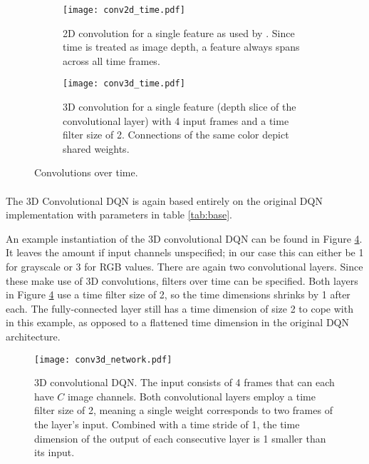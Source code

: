 \begin{figure}[!htpb]
  \begin{subfigure}[t]{.45\textwidth}
    \centering
    \texttt{[image: conv2d\_time.pdf]}
    \caption{
      2D convolution for a single feature as used by \cite{Mnih2013}.
      Since time is treated as image depth,
      a feature always spans across all time frames.
    }
    \label{fig:conv2d_time}
  \end{subfigure}
  \hfill
  \begin{subfigure}[t]{.45\textwidth}
    \centering
    \texttt{[image: conv3d\_time.pdf]}
    \caption{
      3D convolution for a single feature
      (depth slice of the convolutional layer)
      with 4 input frames
      and a time filter size of 2.
      Connections of the same color depict shared weights.
    }
    \label{fig:conv3d_time}
  \end{subfigure}
  \caption{
    Convolutions over time.
  }
  \label{fig:conv3d}
\end{figure}

\paragraph{}
The 3D Convolutional DQN
is again based entirely on the original DQN implementation
with parameters in table \ref{tab:base}.

An example instantiation of the 3D convolutional DQN
can be found in Figure \ref{fig:conv3d_network}.
It leaves the amount if input channels unspecified;
in our case this can either be 1 for grayscale
or 3 for RGB values.
There are again two convolutional layers.
Since these make use of 3D convolutions,
filters over time can be specified.
Both layers in Figure \ref{fig:conv3d_network}
use a time filter size of 2,
so the time dimensions shrinks by 1 after each.
The fully-connected layer
still has a time dimension of size 2 to cope with in this example,
as opposed to a flattened time dimension in the original DQN architecture.

\begin{figure}[htpb]
  \centering
  \texttt{[image: conv3d\_network.pdf]}
  \caption[3D Conv DQN]{
    3D convolutional DQN.
    The input consists of 4 frames
    that can each have $C$ image channels.
    Both convolutional layers employ a time filter size of 2,
    meaning a single weight corresponds to
    two frames of the layer's input.
    Combined with a time stride of 1,
    the time dimension of the output of each consecutive layer
    is 1 smaller than its input.
  }
  \label{fig:conv3d_network}
\end{figure}

